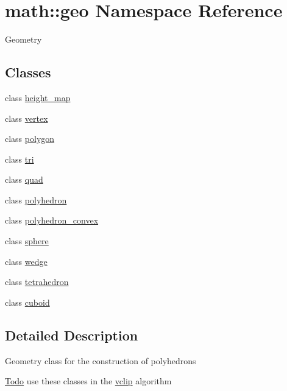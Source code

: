 \hypertarget{namespacemath_1_1geo}{
\section{math::geo Namespace Reference}
\label{namespacemath_1_1geo}
}


Geometry  
\subsection*{Classes}
\begin{DoxyCompactItemize}
\item 
class \hyperlink{classmath_1_1geo_1_1height__map}{height\_\-map}
\item 
class \hyperlink{classmath_1_1geo_1_1vertex}{vertex}
\item 
class \hyperlink{classmath_1_1geo_1_1polygon}{polygon}
\item 
class \hyperlink{classmath_1_1geo_1_1tri}{tri}
\item 
class \hyperlink{classmath_1_1geo_1_1quad}{quad}
\item 
class \hyperlink{classmath_1_1geo_1_1polyhedron}{polyhedron}
\item 
class \hyperlink{classmath_1_1geo_1_1polyhedron__convex}{polyhedron\_\-convex}
\item 
class \hyperlink{classmath_1_1geo_1_1sphere}{sphere}
\item 
class \hyperlink{classmath_1_1geo_1_1wedge}{wedge}
\item 
class \hyperlink{classmath_1_1geo_1_1tetrahedron}{tetrahedron}
\item 
class \hyperlink{classmath_1_1geo_1_1cuboid}{cuboid}
\end{DoxyCompactItemize}


\subsection{Detailed Description}
Geometry class for the construction of polyhedrons

\begin{Desc}
\item[\hyperlink{todo__todo000001}{Todo}]use these classes in the \hyperlink{namespacemath_1_1vclip}{vclip} algorithm \end{Desc}
